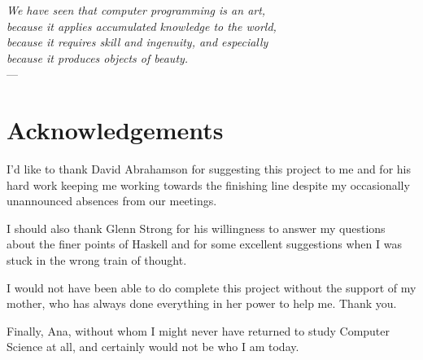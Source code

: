

\begin{flushright}{\slshape    
We have seen that computer programming is an art, \\ 
because it applies accumulated knowledge to the world, \\ 
because it requires skill and ingenuity, and especially \\
because it produces objects of beauty.} \\ \medskip
---  \citep{knuth:1974}
\end{flushright}

\bigskip


\begingroup

\let\clearpage\relax
\let\cleardoublepage\relax
\let\cleardoublepage\relax

\chapter*{Acknowledgements} %

I'd like to thank David Abrahamson for suggesting this project to me and for his hard work keeping me working towards the finishing line despite my occasionally unannounced absences from our meetings.

I should also thank Glenn Strong for his willingness to answer my questions about the finer points of Haskell and for some excellent suggestions when I was stuck in the wrong train of thought.

I would not have been able to do complete this project without the support of my mother, who has always done everything in her power to help me. Thank you.

Finally, Ana, without whom I might never have returned to study Computer Science at all, and certainly would not be who I am today.

\endgroup
